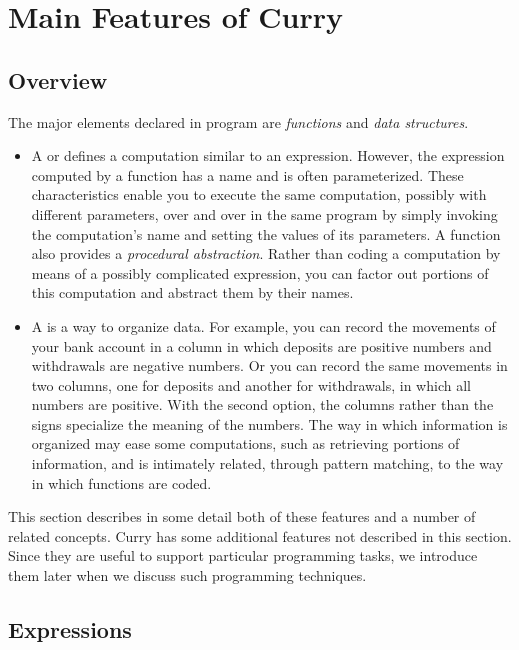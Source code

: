 \chapter{Main Features of Curry}

\section{Overview}

The major elements declared in program are
\emph{functions} and \emph{data structures}.

\begin{itemize}
\item{} 
A  or  defines
a computation similar to an expression.
However, the expression computed by a function
has a name and is often parameterized.
These characteristics enable you to execute the same computation, possibly
with different parameters, over and over in the same program
by simply invoking the computation's name
and setting the values of its parameters.
A function also provides a \emph{procedural abstraction}.
Rather than coding a computation by means of a possibly
complicated expression, you can factor out portions of this computation
and abstract them by their names.
\item{} 
A  is a way to organize data.
For example, you can record the movements of your bank account
in a column in which deposits are positive numbers and withdrawals
are negative numbers.  Or you can record the same movements in
two columns, one for deposits and another for withdrawals,
in which all numbers are positive.
With the second option,
the columns rather than the signs specialize the meaning of the numbers.
The way in which information is organized may ease some computations,
such as retrieving portions of information, and
is intimately related, through pattern matching,
to the way in which functions are coded.
\end{itemize}
%
This section describes in some detail both of these features and
a number of related concepts.
Curry has some additional features not described in this section.
Since they are useful to support particular programming tasks,
we introduce them later when we discuss such programming techniques.


\section{Expressions}

